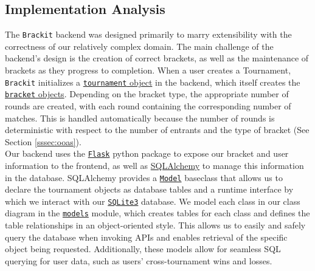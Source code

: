 \documentclass{article}
\begin{document}
\subsection{Implementation Analysis}


    The \texttt{Brackit} backend was designed primarily to marry extensibility with the correctness of 
our relatively complex domain. The main challenge of the backend's design is the creation of 
correct brackets, as well as the maintenance of brackets as they progress to completion.
When a user creates a Tournament, \texttt{Brackit} initializes a \href{https://github.com/alextrosta/brackit/blob/master/backend/tournament.py#L18}{\texttt{tournament} object} in the backend, which itself creates
the \href{https://github.com/alextrosta/brackit/blob/master/backend/tournament.py#L59}{\texttt{bracket} objects}. Depending on the bracket type, the appropriate number of rounds are created, 
with each round containing the corresponding number of matches. This is handled automatically because
the number of rounds is deterministic with respect to the number of entrants and the type of bracket (See Section \ref{sssec:ooas}).\\
Our backend uses the \href{https://flask.palletsprojects.com/en/1.1.x/}{\texttt{Flask}} python package to expose our bracket and user information to 
the frontend, as well as \href{https://www.sqlalchemy.org/}{SQLAlchemy} to manage this information in the database. SQLAlchemy provides a \href{https://flask-sqlalchemy.palletsprojects.com/en/2.x/models/}{\texttt{Model}} baseclass that allows us to declare the tournament objects as database tables and a runtime interface by which we interact with our \href{https://www.sqlite.org/index.html}{\texttt{SQLite3}} database. We model each class in our class diagram in the \href{https://github.com/alextrosta/brackit/blob/master/backend/app/models.py}{\texttt{models}} module, which creates 
tables for each class and defines the table relationships in an object-oriented style. This 
allows us to easily and safely query the database when invoking APIs and enables 
retrieval of the specific object being requested. Additionally, these models allow for 
seamless SQL querying for user data, such as users' cross-tournament wins and losses. 
\end{document}
